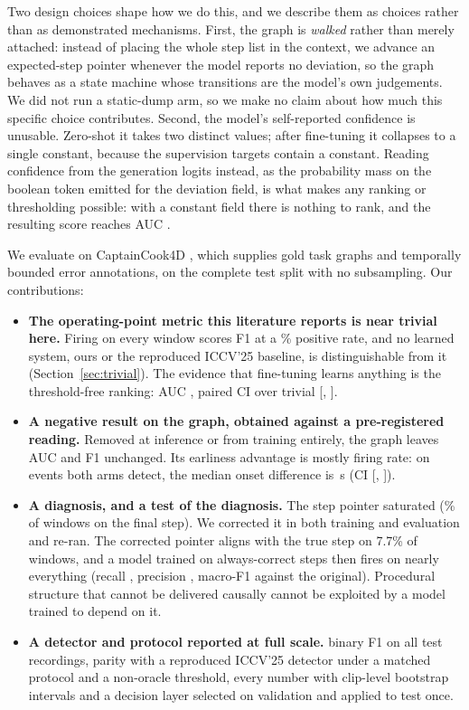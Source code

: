 \documentclass[10pt,twocolumn]{article}
\begin{document}
Two design choices shape how we do this, and we describe them as choices rather
than as demonstrated mechanisms. First, the graph is \emph{walked} rather than
merely attached: instead of placing the whole step list in the context, we
advance an expected-step pointer whenever the model reports no deviation, so the
graph behaves as a state machine whose transitions are the model's own
judgements. We did not run a static-dump arm, so we make no claim about how much
this specific choice contributes. Second, the model's self-reported confidence
is unusable. Zero-shot it takes two distinct values; after fine-tuning it
collapses to a single constant, because the supervision targets contain a
constant. Reading confidence from the generation logits instead, as the
probability mass on the boolean token emitted for the deviation field, is what
makes any ranking or thresholding possible: with a constant field there is
nothing to rank, and the resulting score reaches AUC \resAUC{}.

We evaluate on CaptainCook4D \citep{peddi2024captaincook4d}, which supplies gold
task graphs and temporally bounded error annotations, on the complete test split
with no subsampling. Our contributions:

\begin{itemize}\itemsep2pt
\item \textbf{The operating-point metric this literature reports is near
      trivial here.} Firing on every window scores \afF{} F1 at a \posRate{}\%
      positive rate, and no learned system, ours or the reproduced ICCV'25
      baseline, is distinguishable from it (Section~\ref{sec:trivial}). The
      evidence that fine-tuning learns anything is the threshold-free ranking:
      AUC \resAUC{}, paired CI over trivial [\afAucLo{}, \afAucHi{}].
\item \textbf{A negative result on the graph, obtained against a pre-registered
      reading.} Removed at inference or from training entirely, the graph leaves
      AUC and F1 unchanged. Its earliness advantage is mostly firing rate: on
      events both arms detect, the median onset difference is \moMed{}\,s
      (CI [\moLo{}, \moHi{}]).
\item \textbf{A diagnosis, and a test of the diagnosis.} The step pointer
      saturated (\satPct{}\% of windows on the final step). We corrected it in
      both training and evaluation and re-ran. The corrected pointer aligns with
      the true step on 7.7\% of windows, and a model trained on always-correct
      steps then fires on nearly everything (recall \fxR{}, precision \fxP{},
      macro-F1 \fxMacroDelta{} against the original). Procedural structure that
      cannot be delivered causally cannot be exploited by a model trained to
      depend on it.
\item \textbf{A detector and protocol reported at full scale.} \resF{} binary F1
      on all \resClips{} test recordings, parity with a reproduced ICCV'25
      detector \citep{patsch2025mistsense} under a matched protocol and a
      non-oracle threshold, every number with clip-level bootstrap intervals and
      a decision layer selected on validation and applied to test once.
\end{itemize}
\end{document}
